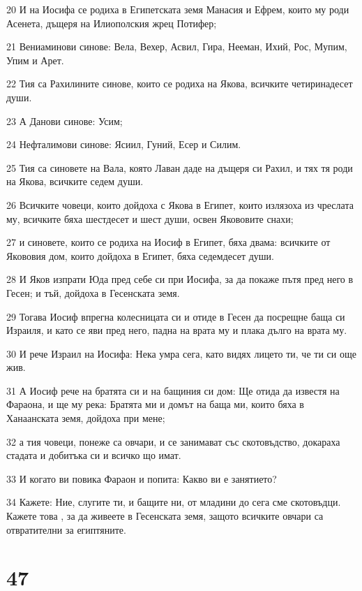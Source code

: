 \par 20 И на Иосифа се родиха в Египетската земя Манасия и Ефрем, които му роди Асенета, дъщеря на Илиополския жрец Потифер;
\par 21 Вениаминови синове: Вела, Вехер, Асвил, Гира, Нееман, Ихий, Рос, Мупим, Упим и Арет.
\par 22 Тия са Рахилините синове, които се родиха на Якова, всичките четиринадесет души.
\par 23 А Данови синове: Усим;
\par 24 Нефталимови синове: Ясиил, Гуний, Есер и Силим.
\par 25 Тия са синовете на Вала, която Лаван даде на дъщеря си Рахил, и тях тя роди на Якова, всичките седем души.
\par 26 Всичките човеци, които дойдоха с Якова в Египет, които излязоха из чреслата му, всичките бяха шестдесет и шест души, освен Якововите снахи;
\par 27 и синовете, които се родиха на Иосиф в Египет, бяха двама: всичките от Якововия дом, които дойдоха в Египет, бяха седемдесет души.
\par 28 И Яков изпрати Юда пред себе си при Иосифа, за да покаже пътя пред него в Гесен; и тъй, дойдоха в Гесенската земя.
\par 29 Тогава Иосиф впрегна колесницата си и отиде в Гесен да посрещне баща си Израиля, и като се яви пред него, падна на врата му и плака дълго на врата му.
\par 30 И рече Израил на Иосифа: Нека умра сега, като видях лицето ти, че ти си още жив.
\par 31 А Иосиф рече на братята си и на бащиния си дом: Ще отида да известя на Фараона, и ще му река: Братята ми и домът на баща ми, които бяха в Ханаанската земя, дойдоха при мене;
\par 32 а тия човеци, понеже са овчари, и се занимават със скотовъдство, докараха стадата и добитъка си и всичко що имат.
\par 33 И когато ви повика Фараон и попита: Какво ви е занятието?
\par 34 Кажете: Ние, слугите ти, и бащите ни, от младини до сега сме скотовъдци. Кажете това , за да живеете в Гесенската земя, защото всичките овчари са отвратителни за египтяните.

\chapter{47}

